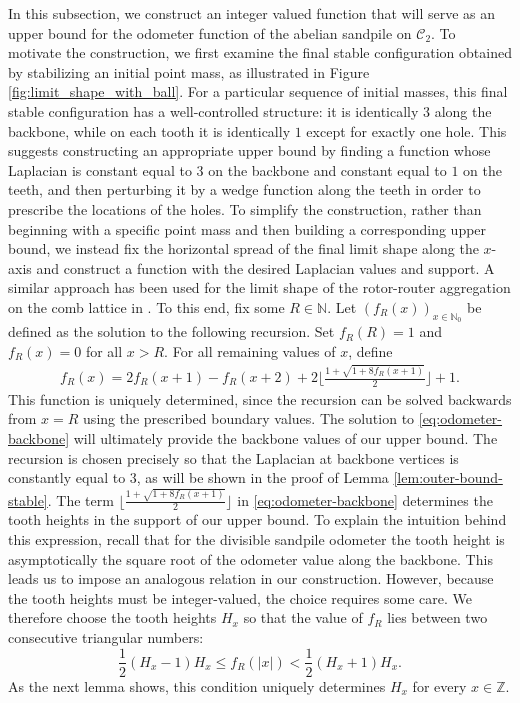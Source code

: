 \documentclass[11pt]{article}
\begin{document}
In this subsection, we construct an integer valued function that will serve as an upper bound for the odometer function of the abelian sandpile on $\mathcal{C}_2$. To motivate the construction, we first examine the final stable configuration obtained by stabilizing an initial point mass, as illustrated in Figure \ref{fig:limit_shape_with_ball}. For a particular sequence of initial masses, this final stable configuration has a well-controlled structure: it is identically $3$ along the backbone, while on each tooth it is identically $1$ except for exactly one hole. This suggests constructing an appropriate upper bound by finding a function whose Laplacian is constant equal to $3$ on the backbone and constant equal to $1$ on the teeth, and then perturbing it by a wedge function along the teeth in order to prescribe the locations of the holes. To simplify the construction, rather than beginning with a specific point mass and then building a corresponding upper bound, we instead fix the horizontal spread of the final limit shape along the $x$-axis and construct a function with the desired Laplacian values and support.  A similar approach has been used for the limit shape of the rotor-router aggregation on the comb lattice in \cite{Huss-Sava-2012-RRComb}.
To this end, fix some $R \in \mathbb{N}$. Let $(f_R(x))_{x \in \mathbb{N}_0}$ be defined as the solution to the following recursion. Set $f_R(R)=1$ and $f_R(x)=0$ for all $x>R$. For all remaining values of $x$, define
\begin{align}\label{eq:odometer-backbone}\tag{Rec-BB}
    f_R(x)   = 2f_R(x+1)-f_R(x+2) +2\Big\lfloor \frac{1+\sqrt{1+8f_R(x+1)}}{2}\Big\rfloor +1.
\end{align}
This function is uniquely determined, since the recursion can be solved backwards from $x=R$ using the prescribed boundary values. 
The solution to \eqref{eq:odometer-backbone} will ultimately provide the backbone values of our upper bound. The recursion is chosen precisely so that the Laplacian at backbone vertices is constantly equal to $3$, as will be shown in the proof of Lemma \ref{lem:outer-bound-stable}.  
The term $\Big\lfloor \frac{1+\sqrt{1+8f_R(x+1)}}{2}\Big\rfloor$
in \eqref{eq:odometer-backbone} determines the tooth heights in the support of our upper bound. To explain the intuition behind this expression, recall that for the divisible sandpile odometer  the tooth height is asymptotically  the square root of the odometer value along the backbone. This leads us to impose an analogous relation in our construction. However, because the tooth heights must be integer-valued, the choice requires some care.  We therefore choose the tooth heights $H_x$ so that the value of $f_R$ lies between two consecutive triangular numbers:
\[
\frac{1}{2}(H_x-1)H_x\leq f_R(|x|)<\frac{1}{2}(H_x+1)H_x.
\]
As the next lemma shows, this condition uniquely determines $H_x$ for every $x\in\mathbb{Z}$.
\end{document}
